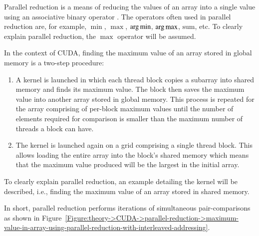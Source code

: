 Parallel reduction is a means of reducing the values of an array into a single value using an associative binary operator \cite{Kirk2013}.
The operators often used in parallel reduction are, for example, $\min$, $\max$, $\operatorname*{arg\,min}$, $\operatorname*{arg\,max}$, $\mathrm{sum}$, etc.
To clearly explain parallel reduction, the $\max$ operator will be assumed.

In the context of CUDA, finding the maximum value of an array stored in global memory is a two-step procedure:

\begin{enumerate}
	\item A kernel is launched in which each thread block copies a subarray into shared memory and finds its maximum value.
The block then saves the maximum value into another array stored in global memory.
This process is repeated for the array comprising of per-block maximum values until the number of elements required for comparison is smaller than the maximum number of threads a block can have.
	\item The kernel is launched again on a grid comprising a single thread block.
This allows loading the entire array into the block's shared memory which means that the maximum value produced will be the largest in the initial array.
\end{enumerate}

To clearly explain parallel reduction, an example detailing the kernel will be described, i.e., finding the maximum value of an array stored in shared memory.

In short, parallel reduction performs iterations of simultaneous pair-comparisons as shown in Figure~\ref{Figure:theory->CUDA->parallel-reduction->maximum-value-in-array-using-parallel-reduction-with-interleaved-addressing}.

